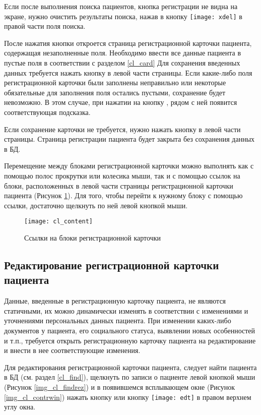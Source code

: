 \begin{vnim}
Если после выполнения поиска пациентов, кнопка регистрации не видна на экране, нужно очистить результаты поиска, нажав в кнопку \texttt{[image: xdel]} в правой части поля поиска.
\end{vnim}
 
После нажатия кнопки  откроется страница регистрационной карточки пациента,  содержащая незаполненные поля. Необходимо ввести все данные пациента в пустые поля в соответствии с разделом \ref{cl_card} Для сохранения введенных данных требуется нажать кнопку  в левой части страницы. Если какие-либо поля регистрационной карточки были заполнены неправильно или некоторые обязательные для заполнения поля остались пустыми, сохранение будет невозможно. В этом случае, при нажатии на кнопку , рядом с ней появится соответствующая подсказка.

Если сохранение карточки не требуется, нужно нажать кнопку  в левой части страницы. Страница регистрации пациента будет закрыта без сохранения данных в БД.

Перемещение между блоками регистрационной карточки можно выполнять как с помощью полос прокрутки или колесика мыши, так и с помощью ссылок на блоки, расположенных в левой части страницы регистрационной карточки пациента (Рисунок \ref{img_cl_content}). Для того, чтобы перейти к нужному блоку с помощью ссылки, достаточно щелкнуть по ней левой кнопкой мыши.

\begin{figure}[ht]\centering
 \texttt{[image: cl\_content]}
 \caption{Ссылки на блоки регистрационной карточки}
 \label{img_cl_content}
\end{figure} 

\subsection{Редактирование регистрационной карточки пациента}

Данные, введенные в регистрационную карточку пациента, не являются статичными, их можно динамически изменять в соответствии с изменениями и уточнениями персональных данных пациента. При изменении каких-либо документов у пациента, его социального статуса, выявлении новых особенностей и т.п., требуется открыть регистрационную карточку пациента на редактирование и внести в нее соответствующие изменения. 

Для редактирования регистрационной карточки пациента, следует найти пациента в БД (см. раздел \ref{cl_find}), щелкнуть по записи о пациенте левой кнопкой мыши (Рисунок \ref{img_cl_findrez}) и в появившемся всплывающем окне (Рисунок \ref{img_cl_contrwin}) нажать кнопку  или кнопку \texttt{[image: edt]} в правом верхнем углу окна. 

